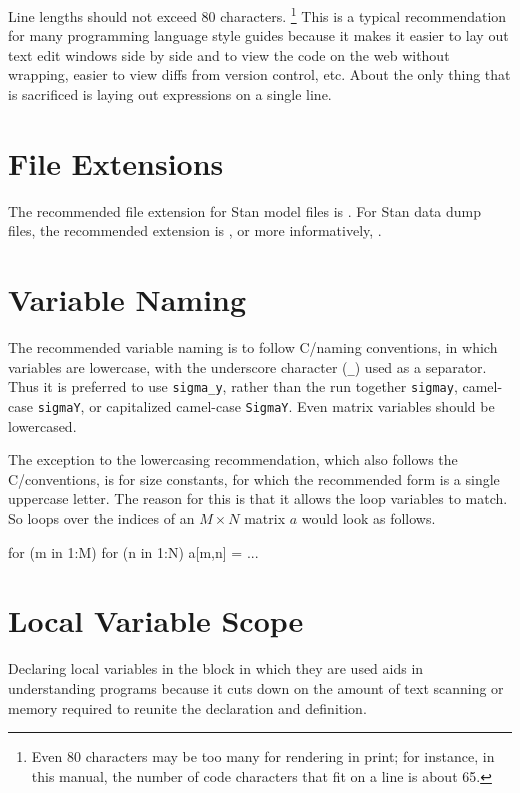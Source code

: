 Line lengths should not exceed 80 characters.%
%
\footnote{Even 80 characters may be too many for rendering in print;
  for instance, in this manual, the number of code characters that fit
  on a line is about 65.}
%
This is a typical recommendation for many programming language style
guides because it makes it easier to lay out text edit windows side by
side and to view the code on the web without wrapping, easier to view
diffs from version control, etc.  About the only thing that is
sacrificed is laying out expressions on a single line.

\section{File Extensions}

The recommended file extension for Stan model files is .
For Stan data dump files, the recommended extension is , or
more informatively, .

\section{Variable Naming}

The recommended variable naming is to follow C/\Cpp naming
conventions, in which variables are lowercase, with the underscore
character (\Verb|_|) used as a separator.  Thus it is preferred to use
\Verb|sigma_y|, rather than the run together \Verb|sigmay|, camel-case
\Verb|sigmaY|, or capitalized camel-case \Verb|SigmaY|.  Even matrix
variables should be lowercased.

The exception to the lowercasing recommendation, which also follows
the C/\Cpp conventions, is for size constants, for which the
recommended form is a single uppercase letter.  The reason for this is
that it allows the loop variables to match.  So loops over the indices of
an $M \times N$ matrix $a$ would look as follows.
%
\begin{stancode}
for (m in 1:M)
  for (n in 1:N)
     a[m,n] = ...
\end{stancode}


\section{Local Variable Scope}

Declaring local variables in the block in which they are used aids in
understanding programs because it cuts down on the amount of text
scanning or memory required to reunite the declaration and definition.

